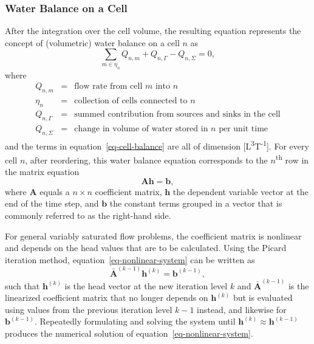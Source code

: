 \documentclass[fleqn]{article}
\begin{document}
\subsubsection*{Water Balance on a Cell}
After the integration over the cell volume, the resulting equation
represents the concept of (volumetric) water balance on a cell $n$ as
\begin{equation}
  \sum_{m \in \eta_n} Q_{n,m} + Q_{n, \Gamma} - Q_{n,\Sigma} = 0,
  \label{eq-cell-balance}
\end{equation}
where
\begin{eqnarray*}
  Q_{n,m} &=& \text{flow rate from cell $m$ into $n$} \\
  \eta_n &=& \text{collection of cells connected to $n$} \\
  Q_{n,\Gamma} &=& \text{summed contribution from sources and sinks in the cell} \\
  Q_{n,\Sigma} &=& \text{change in volume of water stored in $n$ per unit time}
\end{eqnarray*}
and the terms in equation~\ref{eq-cell-balance} are all of dimension
  [L\textsuperscript{3}T\textsuperscript{-1}]. For every cell $n$, after
reordering, this water balance equation corresponds to the 
$n$\textsuperscript{th} row in the matrix equation
\begin{equation}
  \mathbf{A}\mathbf{h} = \mathbf{b},
  \label{eq-nonlinear-system}
\end{equation}
where $\mathbf{A}$ equals a $n \times n$ coefficient matrix, $\mathbf{h}$
the dependent variable vector at the end of the time step, and
$\mathbf{b}$ the constant terms grouped in a vector that is commonly
referred to as the right-hand side. 

For general variably saturated flow problems, the coefficient matrix is 
nonlinear and depends on the head values that are to be calculated. 
Using the Picard iteration method, equation~\ref{eq-nonlinear-system}
can be written as
\begin{equation}
  \mathbf{\bar{A}}^{(k-1)} \mathbf{h}^{(k)} = \mathbf{b}^{(k-1)},
  \label{eq-linearized-system}
\end{equation}
such that $\mathbf{h}^{(k)}$ is the head vector at the new iteration level
$k$ and $\mathbf{\bar{A}}^{(k-1)}$ is the linearized coefficient matrix
that no longer depends on $\mathbf{h}^{(k)}$ but is evaluated using values
from the previous iteration level $k-1$ instead, and likewise for 
$\mathbf{b}^{(k-1)}$. Repeatedly formulating and solving the system until 
$\mathbf{h}^{(k)} \approx \mathbf{h}^{(k-1)}$ produces the numerical 
solution of equation~\ref{eq-nonlinear-system}.
\end{document}
